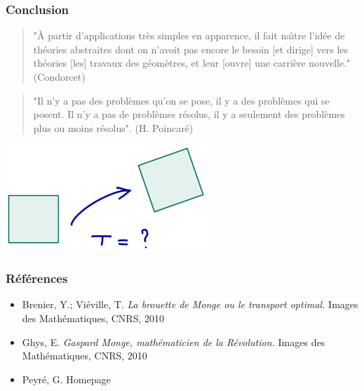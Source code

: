 \documentclass[9pt]{beamer}
\begin{document}
\begin{frame}
\frametitle{\bf Conclusion}

\begin{quote}
"\`A partir d'applications tr\`es simples en apparence, il fait na\^\i tre l'id\'ee de th\'eories abstraites dont on n'avoit pas encore le besoin [et dirige] vers les th\'eories [les] travaux des g\'eom\`etres, et leur [ouvre] une carri\`ere nouvelle." (Condorcet)
\end{quote}
 
\begin{quote}
"Il n'y a pas des probl\`emes qu'on se pose, il y a des probl\`emes qui se posent. Il n'y a pas de probl\`emes r\'esolus, il y a seulement des probl\`emes plus ou moins r\'esolus". (H. Poincar\'e)
\end{quote}

\centering \includegraphics[height=4.0cm]{carre}

\end{frame}

\begin{frame}
\frametitle{\bf R\'ef\'erences}
 
\begin{itemize}
  \item Brenier, Y.; Vi\'eville, T. \emph{La brouette de Monge ou le transport optimal.} Images des Math\'ematiques, CNRS, 2010
  \item Ghys, E. \emph{Gaspard Monge, math\'ematicien de la R\'evolution.} Images des Math\'ematiques, CNRS, 2010
  \item Peyr\'e, G. Homepage
\end{itemize}

\end{frame}

\end{document}
